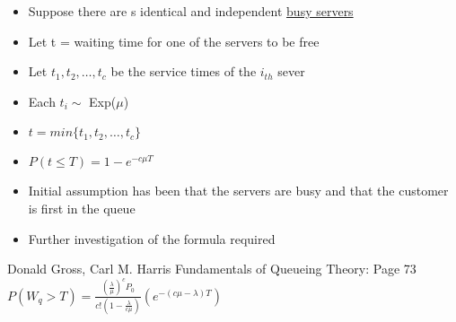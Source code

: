 \documentclass{article}
\begin{document}
\begin{itemize}
    \item Suppose there are s identical and independent \underline{busy servers} 
    \item Let t = waiting time for one of the servers to be free
    \item Let $t_1, t_2, \dots, t_c$ be the service times of the $i_{th}$ sever 
    \item Each $t_i \sim$ Exp($\mu$)
    \item $t = min \{t_1, t_2 , \dots, t_c \}$
    \item $P(t \leq T) = 1 - e^{-c \mu T}$
    \item Initial assumption has been that the servers are busy and that the customer is first in the queue
    \item Further investigation of the formula required
\end{itemize}

\newpage
Donald Gross, Carl M. Harris
Fundamentals of Queueing Theory: Page 73
$ P(W_q > T) = \frac{(\frac{\lambda}{\mu})^c P_0}{c!(1-\frac{\lambda}{c \mu})} (e^{-(c \mu - \lambda)T}) $
\end{document}

